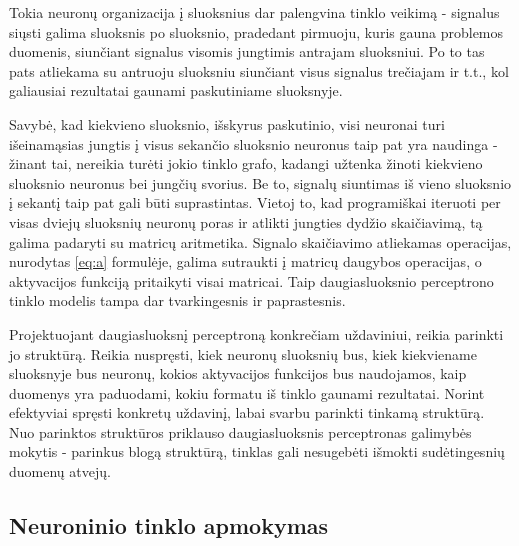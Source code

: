 \documentclass{VUMIFPSbakalaurinis}
\begin{document}
Tokia neuronų organizacija į sluoksnius dar palengvina tinklo veikimą - signalus siųsti galima sluoksnis po sluoksnio, pradedant pirmuoju, kuris gauna problemos duomenis, siunčiant signalus visomis jungtimis antrajam sluoksniui.
Po to tas pats atliekama su antruoju sluoksniu siunčiant visus signalus trečiajam ir t.t., kol galiausiai rezultatai gaunami paskutiniame sluoksnyje.

Savybė, kad kiekvieno sluoksnio, išskyrus paskutinio, visi neuronai turi išeinamąsias jungtis į visus sekančio sluoksnio neuronus taip pat yra naudinga - žinant tai, nereikia turėti jokio tinklo grafo, kadangi užtenka žinoti kiekvieno sluoksnio neuronus bei jungčių svorius.
Be to, signalų siuntimas iš vieno sluoksnio į sekantį taip pat gali būti suprastintas.
Vietoj to, kad programiškai iteruoti per visas dviejų sluoksnių neuronų poras ir atlikti jungties dydžio skaičiavimą, tą galima padaryti su matricų aritmetika.
Signalo skaičiavimo atliekamas operacijas, nurodytas \ref{eq:a} formulėje, galima sutraukti į matricų daugybos operacijas, o aktyvacijos funkciją pritaikyti visai matricai.
Taip daugiasluoksnio perceptrono tinklo modelis tampa dar tvarkingesnis ir paprastesnis.

Projektuojant daugiasluoksnį perceptroną konkrečiam uždaviniui, reikia parinkti jo struktūrą.
Reikia nuspręsti, kiek neuronų sluoksnių bus, kiek kiekviename sluoksnyje bus neuronų, kokios aktyvacijos funkcijos bus naudojamos, kaip duomenys yra paduodami, kokiu formatu iš tinklo gaunami rezultatai.
Norint efektyviai spręsti konkretų uždavinį, labai svarbu parinkti tinkamą struktūrą.
Nuo parinktos struktūros priklauso daugiasluoksnis perceptronas galimybės mokytis - parinkus blogą struktūrą, tinklas gali nesugebėti išmokti sudėtingesnių duomenų atvejų.



\subsection{Neuroninio tinklo apmokymas} \label{network-learning}

\end{document}
